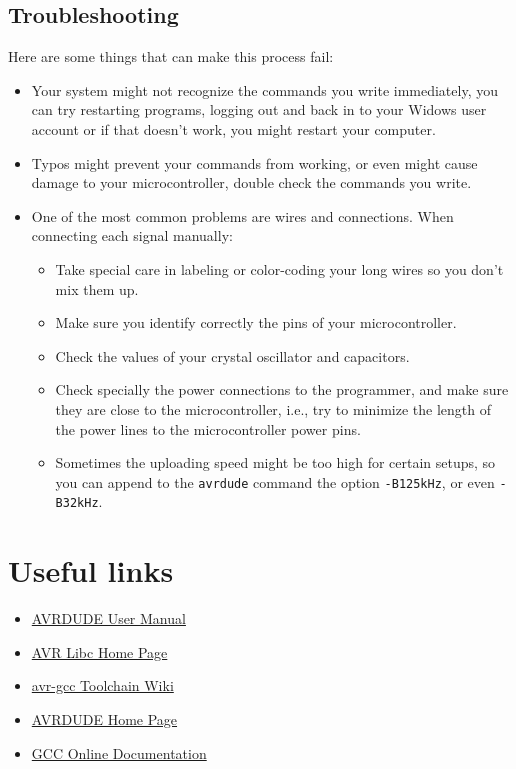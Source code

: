 \documentclass[10pt,letterpaper]{article}
\begin{document}
\subsection{Troubleshooting}
Here are some things that can make this process fail:
\begin{itemize}
    \item Your system might not recognize the commands you write immediately, you can try restarting programs, logging out and back in to your Widows user account or if that doesn't work, you might restart your computer.
    \item Typos might prevent your commands from working, or even might cause damage to your microcontroller, double check the commands you write.
    \item One of the most common problems are wires and connections. When connecting each signal manually:
    \begin{itemize}
        \item Take special care in labeling or color-coding your long wires so you don't mix them up.
        \item Make sure you identify correctly the pins of your microcontroller. 
        \item Check the values of your crystal oscillator and capacitors.
        \item Check specially the power connections to the programmer, and make sure they are close to the microcontroller, i.e., try to minimize the length of the power lines to the microcontroller power pins.
        \item Sometimes the uploading speed might be too high for certain setups, so you can append to the \texttt{avrdude} command the option \texttt{-B125kHz}, or even \texttt{-B32kHz}.
    \end{itemize}
    
\end{itemize}

\section{Useful links}
\begin{itemize}
    \item \href{https://avrdudes.github.io/avrdude/}{AVRDUDE User Manual}
    \item \href{https://www.nongnu.org/avr-libc/}{AVR Libc Home Page}
    \item \href{https://gcc.gnu.org/wiki/avr-gcc}{avr-gcc Toolchain Wiki}
    \item \href{https://www.nongnu.org/avrdude/}{AVRDUDE Home Page}
    \item \href{https://gcc.gnu.org/onlinedocs/gcc/}{GCC Online Documentation}
\end{itemize}
\end{document}
